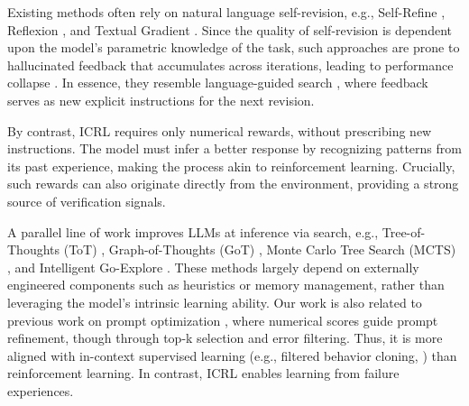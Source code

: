 \documentclass{article} %
\newcommand{\0}{\mathbf{0}}
\begin{document}
Existing methods often rely on natural language self-revision, e.g., Self-Refine \citep{self-refine}, Reflexion \citep{shinn2023reflexion}, and Textual Gradient \citep{textgrad}. Since the quality of self-revision is dependent upon the model's parametric knowledge of the task, such approaches are prone to hallucinated feedback that accumulates across iterations, leading to performance collapse \citep{self-verification-limitation}. In essence, they resemble language-guided search \citep{liu2025synthesizing}, where feedback serves as new explicit instructions for the next revision. 

By contrast, ICRL requires only numerical rewards, without prescribing new instructions. The model must infer a better response by recognizing patterns from its past experience, making the process akin to reinforcement learning. Crucially, such rewards can also originate directly from the environment, providing a strong source of verification signals.

A parallel line of work improves LLMs at inference via search, e.g., Tree-of-Thoughts (ToT) \citep{tot}, Graph-of-Thoughts (GoT) \citep{GoT}, Monte Carlo Tree Search (MCTS) \citep{everything-of-thought}, and Intelligent Go-Explore \citep{intelligent-go-explore}. These methods largely depend on externally engineered components such as heuristics or memory management, rather than leveraging the model’s intrinsic learning ability. Our work is also related to previous work on prompt optimization
\citep{llm_as_optimizers}, where numerical scores guide prompt refinement, though through top-k selection and error filtering. Thus, it is more aligned with in-context supervised learning (e.g., filtered behavior cloning, \citet{grigsby2023amago}) than reinforcement learning. In contrast, ICRL enables learning from failure experiences.







\end{document}
